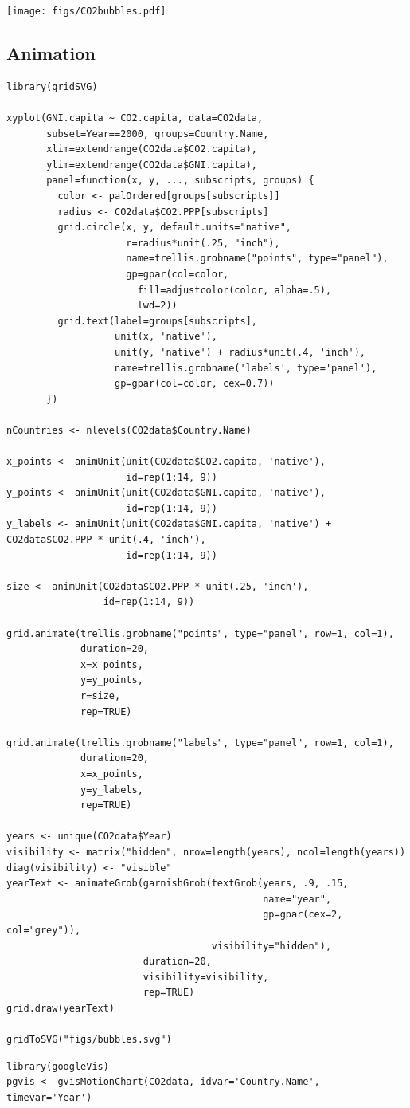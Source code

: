 \texttt{[image: figs/CO2bubbles.pdf]}

    
\subsection{Animation}
\label{sec-1-5}



\lstset{language=R}
\begin{lstlisting}
library(gridSVG)

xyplot(GNI.capita ~ CO2.capita, data=CO2data,
       subset=Year==2000, groups=Country.Name,
       xlim=extendrange(CO2data$CO2.capita),
       ylim=extendrange(CO2data$GNI.capita),
       panel=function(x, y, ..., subscripts, groups) {
         color <- palOrdered[groups[subscripts]]
         radius <- CO2data$CO2.PPP[subscripts]
         grid.circle(x, y, default.units="native",
                     r=radius*unit(.25, "inch"),
                     name=trellis.grobname("points", type="panel"),
                     gp=gpar(col=color,
                       fill=adjustcolor(color, alpha=.5),
                       lwd=2))
         grid.text(label=groups[subscripts],
                   unit(x, 'native'),
                   unit(y, 'native') + radius*unit(.4, 'inch'),
                   name=trellis.grobname('labels', type='panel'),
                   gp=gpar(col=color, cex=0.7))
       })

nCountries <- nlevels(CO2data$Country.Name)

x_points <- animUnit(unit(CO2data$CO2.capita, 'native'),
                     id=rep(1:14, 9))
y_points <- animUnit(unit(CO2data$GNI.capita, 'native'),
                     id=rep(1:14, 9))
y_labels <- animUnit(unit(CO2data$GNI.capita, 'native') + CO2data$CO2.PPP * unit(.4, 'inch'),
                     id=rep(1:14, 9))

size <- animUnit(CO2data$CO2.PPP * unit(.25, 'inch'),
                 id=rep(1:14, 9))

grid.animate(trellis.grobname("points", type="panel", row=1, col=1),
             duration=20,
             x=x_points,
             y=y_points,
             r=size,
             rep=TRUE)

grid.animate(trellis.grobname("labels", type="panel", row=1, col=1),
             duration=20,
             x=x_points,
             y=y_labels,
             rep=TRUE)

years <- unique(CO2data$Year)
visibility <- matrix("hidden", nrow=length(years), ncol=length(years))
diag(visibility) <- "visible"
yearText <- animateGrob(garnishGrob(textGrob(years, .9, .15,
                                             name="year",
                                             gp=gpar(cex=2, col="grey")),
                                    visibility="hidden"),
                        duration=20,
                        visibility=visibility,
                        rep=TRUE)
grid.draw(yearText)

gridToSVG("figs/bubbles.svg")
\end{lstlisting}


\lstset{language=R}
\begin{lstlisting}
library(googleVis)
pgvis <- gvisMotionChart(CO2data, idvar='Country.Name', timevar='Year')
\end{lstlisting}
